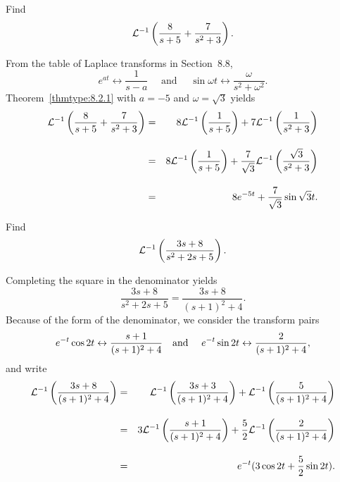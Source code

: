 \begin{example}
  \label{example:8.2.2}\rm Find
  \[
    {\cal L}^{-1}\left(\frac{8}{s+5}+\frac{7}{s^{2}+3}\right).
  \]
\end{example}

\begin{examplesolution}
\solution From the table of Laplace transforms in Section~8.8,
\[
  e^{at}\leftrightarrow\frac{1}{s-a}\quad\mbox{ and }\quad \sin\omega t\leftrightarrow\frac{\omega}{s^{2}+\omega^{2}}.
\]
Theorem~\ref{thmtype:8.2.1} with $a=-5$ and $\omega=\sqrt{3}$ yields
\begin{eqnarray*}
  {\cal L}^{-1}\left(\frac{8}{s+5}+\frac{7}{s^{2}+3}\right) & = & 8{\cal L}^{-1}\left(\frac{1}{s+5}\right)+7{\cal L}^{-1}\left(\frac{1}{s^{2}+3}\right)                         \\[10pt]
                                                            & = & 8{\cal L}^{-1}\left(\frac{1}{s+5}\right)+\frac{7}{\sqrt{3}}{\cal L}^{-1}\left(\frac{\sqrt{3}}{s^{2}+3}\right) \\[10pt]
                                                            & = & 8e^{-5t}+\frac{7}{\sqrt{3}}\sin\sqrt{3}t.
\end{eqnarray*}
\end{examplesolution}

\begin{example}
  \label{example:8.2.3}\rm Find
  \[
    {\cal L}^{-1}\left(\frac{3s+8}{s^{2}+2s+5}\right).
  \]
\end{example}

\begin{examplesolution}
\solution Completing the square in the denominator yields
\[
  \frac{3s+8}{s^{2}+2s+5}=\frac{3s+8}{(s+1)^{2}+4}.
\]
Because of the form of the denominator, we consider the transform pairs
\[
  e^{-t}\cos2t\leftrightarrow\frac{s+1}{(s+1)^{2}+4}\mbox{\quad and \quad}e^{-t}\sin2t\leftrightarrow\frac{2}{(s+1)^{2}+4},
\]
and write
\begin{eqnarray*}
  {\cal L}^{-1}\left(\frac{3s+8}{(s+1)^{2}+4}\right) & = & {\cal L}^{-1}\left(\frac{3s+3}{(s+1)^{2}+4}\right)+{\cal L}^{-1}\left(\frac{5}{(s+1)^{2}+4}\right)            \\[10pt]
                                                     & = & 3{\cal L}^{-1}\left(\frac{s+1}{(s+1)^{2}+4}\right)+\frac{5}{2}{\cal L}^{-1}\left(\frac{2}{(s+1)^{2}+4}\right) \\[10pt]
                                                     & = & e^{-t}(3\cos2t+\frac{5}{2}\sin2t).
\end{eqnarray*}
\end{examplesolution}


